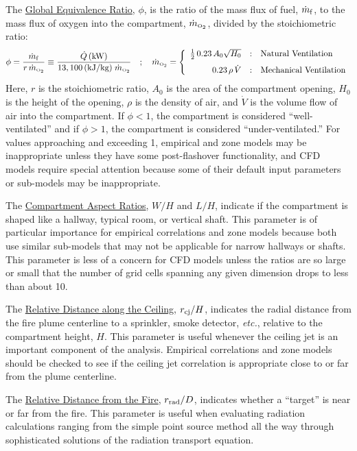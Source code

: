 \documentclass[fleqn,b5paper]{article}
\begin{document}
The \underline{Global Equivalence Ratio}, $\phi$, is the ratio of the mass flux of fuel, $\dot{m}_{\rm f}$, to the mass flux of oxygen into the compartment, $\dot{m}_{\hbox{\tiny O$_2$}}$, divided by the stoichiometric ratio:
\begin{equation} \phi = \frac{\dot{m}_{\rm f}}{r\, \dot{m}_{\hbox{\tiny O$_2$}}} \equiv  \frac{\dot{Q} \, \hbox{(kW)}}{13,100 \, \hbox{(kJ/kg)} \; \dot{m}_{\hbox{\tiny O$_2$}} } \quad ; \quad  \dot{m}_{\hbox{\tiny O$_2$}} = \left\{
   \begin{array}{r@{\quad:\quad}l}
      \frac{1}{2} \, 0.23 \, A_0 \sqrt{H_0} & \hbox{Natural Ventilation} \\[0.1in]
      0.23 \, \rho \, \dot{V}       & \hbox{Mechanical Ventilation} \end{array} \right.
\end{equation}
Here, $r$ is the stoichiometric ratio, $A_0$ is the area of the compartment opening, $H_0$ is the height of the opening, $\rho$ is the density of air, and $\dot{V}$ is the volume flow of air into the compartment. If $\phi<1$, the compartment is considered ``well-ventilated'' and if $\phi>1$, the compartment is considered ``under-ventilated.'' For values approaching and exceeding 1, empirical and zone models may be inappropriate unless they have some post-flashover functionality, and CFD models require special attention because some of their default input parameters or sub-models may be inappropriate.

The \underline{Compartment Aspect Ratios}, $W/H$ and $L/H$, indicate if the compartment is shaped like a hallway, typical room, or vertical shaft. This parameter is of particular importance for empirical correlations and zone models because both use similar sub-models that may not be applicable for narrow hallways or shafts. This parameter is less of a concern for CFD models unless the ratios are so large or small that the number of grid cells spanning any given dimension drops to less than about 10.

The \underline{Relative Distance along the Ceiling}, $r_{\rm cj}/H$, indicates the radial distance from the fire plume centerline to a sprinkler, smoke detector, {\em etc.}, relative to the compartment height, $H$. This parameter is useful whenever the ceiling jet is an important component of the analysis. Empirical correlations and zone models should be checked to see if the ceiling jet correlation is appropriate close to or far from the plume centerline.

The \underline{Relative Distance from the Fire}, $r_{\rm rad}/D$, indicates whether a ``target'' is near or far from the fire. This parameter is useful when evaluating radiation calculations ranging from the simple point source method all the way through sophisticated solutions of the radiation transport equation.
\end{document}
